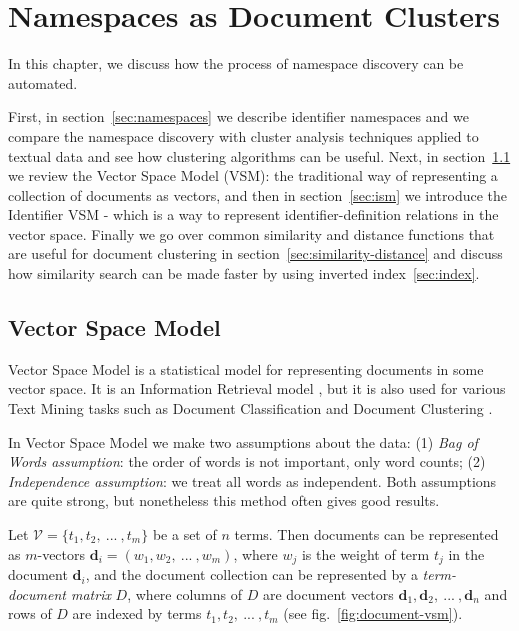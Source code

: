 \section{Namespaces as Document Clusters} \label{sec:namespaces-top}


In this chapter, we discuss how the process of namespace discovery
can be automated.

First, in section~\ref{sec:namespaces} we describe identifier namespaces and
we compare the namespace discovery with cluster analysis techniques
applied to textual data and see how clustering algorithms can be
useful. Next, in section~\ref{sec:vsm}
we review the Vector Space Model (VSM): the traditional way of
representing a collection of documents as vectors, and then in
section~\ref{sec:ism} we introduce the Identifier VSM - which
is a way to represent identifier-definition relations in the
vector space. Finally we go over common similarity and distance
functions that are useful for document clustering in
section~\ref{sec:similarity-distance} and discuss how similarity
search can be made faster by using inverted index~\ref{sec:index}.





\subsection{Vector Space Model} \label{sec:vsm}

Vector Space Model is a statistical model for representing documents
in some vector space. It is an Information Retrieval
model \cite{manning2008introduction}, but it is also used for various
Text Mining tasks such as Document Classification \cite{sebastiani2002machine}
and Document Clustering \cite{oikonomakou2005review} \cite{aggarwal2012survey}.

In Vector Space Model we make two assumptions about the data: 
(1) \emph{Bag of Words assumption}: the order of words is not important,
only word counts;
(2) \emph{Independence assumption}: we treat all words as independent.
Both assumptions are quite strong, but nonetheless this method often
gives good results.

Let $\mathcal V = \{t_1, t_2, \ ... \ , t_m \}$ be a set of $n$ terms.
Then documents can be represented as $m$-vectors 
$\mathbf d_i = (w_1, w_2, \ ... \ , w_m)$, where $w_j$ is the weight 
of term $t_j$ in the document $\mathbf d_i$,
and the document collection can be represented by a \emph{term-document matrix} 
$D$, where columns of $D$ are document vectors 
$\mathbf d_1, \mathbf d_2, \ ... \ , \mathbf d_n$ 
and rows of $D$ are indexed by terms $t_1, t_2, \ ... \ , t_m$
(see fig.~\ref{fig:document-vsm}).

